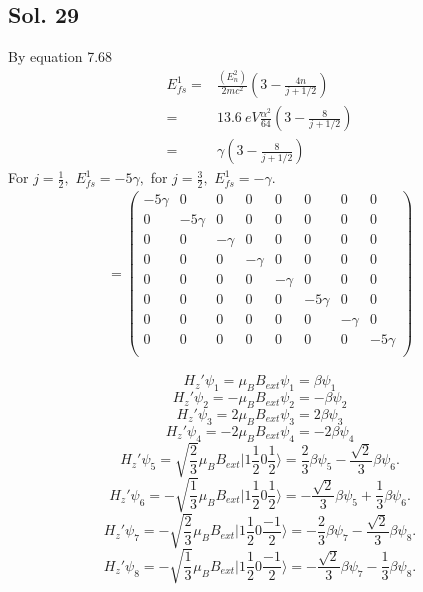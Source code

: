 \subsection*{Sol. 29}
By equation 7.68 
\begin{align*}
    E^1_{fs}=&
    \frac{(E_n^2)}{2mc^2}
    \left(
    3 - \frac{4n}{j+1/2}
    \right)\\
    =&
    \qty{13.6}{eV}
    \frac{\alpha^2}{64}
    \left(
    3 - \frac{8}{j+1/2}
    \right)\\
    =&\gamma
    \left(
    3 - \frac{8}{j+1/2}
    \right)
\end{align*}
For $j=\frac{1}{2},$ $E^1_{fs} = -5\gamma,$ 
for $j=\frac{3}{2},$ $E^1_{fs} = -\gamma.$
\begin{align*}
    [H'_{fs}] = \begin{pmatrix}
        -5\gamma & 0 & 0 & 0 &0 &0 & 0 & 0\\
        0 & -5\gamma & 0 & 0 &0 &0 & 0& 0\\
        0 & 0 & -\gamma & 0 &0 &0 & 0& 0\\
        0 & 0 & 0 & -\gamma &0 &0 & 0& 0\\
        0 & 0 & 0 & 0 &-\gamma &0 & 0& 0\\
        0 & 0 & 0 & 0 &0 &-5\gamma & 0& 0\\
        0 & 0 & 0 & 0 &0 &0 & -\gamma& 0\\
        0 & 0 & 0 & 0 &0 &0 & 0& -5\gamma\\
    \end{pmatrix}
\end{align*}

$$
H_z'\psi_1 = \mu_BB_{ext}\psi_1=\beta\psi_1
$$
$$
H_z'\psi_2 = -\mu_BB_{ext}\psi_2=-\beta\psi_2
$$
$$
H_z'\psi_3 = 2\mu_BB_{ext}\psi_3=2\beta\psi_3
$$
$$
H_z'\psi_4 = -2\mu_BB_{ext}\psi_4=-2\beta\psi_4
$$
$$
H_z'\psi_5 = 
\sqrt{\frac{2}{3}}
\mu_BB_{ext}
|1\frac{1}{2}0\frac{1}{2}\rangle
=\frac{2}{3}\beta\psi_5
-\frac{\sqrt{2}}{3}\beta\psi_6.
$$
$$
H_z'\psi_6 = 
-\sqrt{\frac{1}{3}}
\mu_BB_{ext}
|1\frac{1}{2}0\frac{1}{2}\rangle
=-\frac{\sqrt{2}}{3}\beta\psi_5
+\frac{1}{3}\beta\psi_6.
$$
$$
H_z'\psi_7 = 
-\sqrt{\frac{2}{3}}
\mu_BB_{ext}
|1\frac{1}{2}0\frac{-1}{2}\rangle
=-\frac{2}{3}\beta\psi_7
-\frac{\sqrt{2}}{3}\beta\psi_8.
$$
$$
H_z'\psi_8 = 
-\sqrt{\frac{1}{3}}
\mu_BB_{ext}
|1\frac{1}{2}0\frac{-1}{2}\rangle
=-\frac{\sqrt{2}}{3}\beta\psi_7
-\frac{1}{3}\beta\psi_8.
$$

